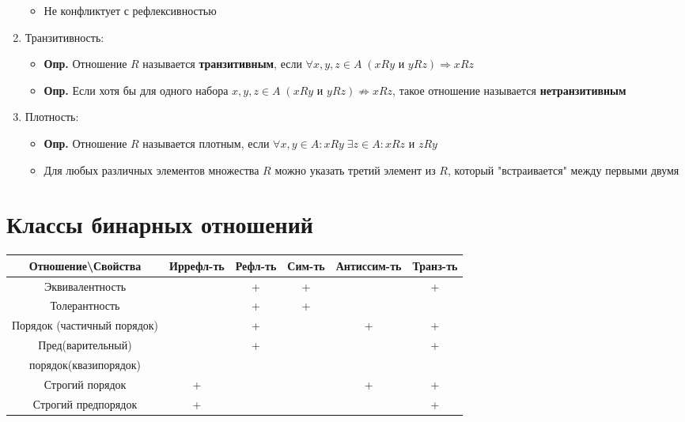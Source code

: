 \documentclass[10pt]{article}
\begin{document}
\begin{enumerate}
\begin{itemize}
            \item Не конфликтует с рефлексивностью
        \end{itemize}
    \item Транзитивность:
        \begin{itemize}
            \item \textbf{Опр.} Отношение $R$ называется \textbf{транзитивным}, если $\forall x, y, z \in A \; (xRy \text{ и } yRz) \Rightarrow  xRz$
            \item \textbf{Опр.} Если хотя бы для одного набора $x, y, z \in A \; (xRy \text{ и } yRz) \not\Rightarrow xRz$, такое отношение называется \textbf{нетранзитивным}
        \end{itemize}
    \item Плотность:
        \begin{itemize}
            \item \textbf{Опр.} Отношение $R$ называется плотным, если $\forall x, y \in A: xRy \; \exists z \in A: xRz \text{ и } zRy$
            \item Для любых различных элементов множества $R$ можно указать третий элемент из $R$, который "встраивается" между первыми двумя
        \end{itemize}
\end{enumerate}

\section*{Классы бинарных отношений}
\begin{tabular}{|c|c|c|c|c|c|}
    \hline
    Отношение\textbackslash Свойства & Иррефл-ть & Рефл-ть & Сим-ть & Антиссим-ть & Транз-ть \\
    \hline
    Эквивалентность & & + & + & & + \\
    \hline
    Толерантность & & + & + & & \\
    \hline
    Порядок (частичный порядок) & & + & & + & + \\
    \hline
    Пред(варительный) & & + & & & + \\
    порядок(квазипорядок) & & & & & \\
    \hline
    Строгий порядок & + & & & + & + \\
    \hline
    Строгий предпорядок & + & & & & + \\
    \hline
\end{tabular}
\end{document}
